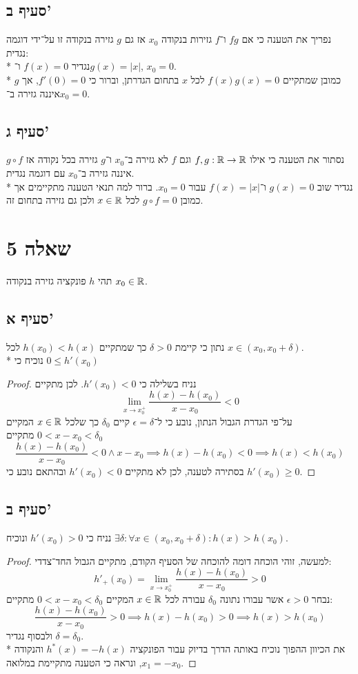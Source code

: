\subsection{סעיף ב'}
נפריך את הטענה כי אם $fg$ ו־$f$ גזירות בנקודה $x_0$ אז גם $g$ גזירה בנקודה זו על־ידי דוגמה נגדית: \\*
נגדיר $f(x) = 0$ ו־$g(x) = |x|$, $x_0 = 0$. \\*
כמובן שמתקיים $f(x) g(x) = 0$ לכל $x$ בתחום הגדרתן, וברור כי $f'(0) = 0$, אך $g$ איננה גזירה ב־$x_0 = 0$.

\subsection{סעיף ג'}
נסתור את הטענה כי אילו $f, g : \mathbb{R} \rightarrow \mathbb{R}$ וגם $f$ לא גזירה ב־$x_0$ ו־$g$ גזירה בכל נקודה אז $g \circ f$ איננה גזירה ב־$x_0$ עם דוגמה נגדית. \\*
נגדיר שוב $g(x) = 0$ ו־$f(x) = |x|$ עבור $x_0 = 0$. ברור למה תנאי הטענה מתקיימים אך כמובן $g \circ f = 0$ לכל $x \in \mathbb{R}$ ולכן גם גזירה בתחום זה.

\section{שאלה 5}
תהי $h$ פונקציה גזירה בנקודה $x_0 \in \mathbb{R}$.
\subsection{סעיף א'}
נתון כי קיימת $\delta > 0$ כך שמתקיים $h(x_0) < h(x)$ לכל $x \in (x_0, x_0 + \delta)$. \\*
נוכיח כי $0 \le h'(x_0)$
\begin{proof}
	נניח בשלילה כי $h'(x_0) < 0$. לכן מתקיים
	\[
		\lim_{x \to x_0^+} \frac{h(x) - h(x_0)}{x - x_0} < 0
	\]
	על־פי הגדרת הגבול הנתון, נובע כי ל־$\epsilon = \delta$ קיים $\delta_0$ כך שלכל $x \in \mathbb{R}$ המקיים $0 < x - x_0 < \delta_0$ מתקיים
	\[
		\frac{h(x) - h(x_0)}{x - x_0} < 0 \land x - x_0 \implies h(x) - h(x_0) < 0 \implies h(x) < h(x_0)
	\]
	בסתירה לטענה, לכן לא מתקיים $h'(x_0) < 0$ ובהתאם נובע כי $h'(x_0) \ge 0$.
\end{proof}

\subsection{סעיף ב'}
נניח כי $h'(x_0) > 0$ ונוכיח $\exists \delta : \forall x \in (x_0, x_0 + \delta) : h(x) > h(x_0)$.
\begin{proof}
	למעשה, זוהי הוכחה דומה להוכחה של הסעיף הקודם, מתקיים הגבול החד־צדדי:
	\[
		h'_+(x_0) = \lim_{x \to x_0^+} \frac{h(x) - h(x_0)}{x - x_0} > 0
	\]
	נבחר $\epsilon > 0$ אשר עבורו נתונה $\delta_0$ עבורה לכל $x \in \mathbb{R}$ המקיים $0 < x - x_0 < \delta_0$ מתקיים:
	\[
		\frac{h(x) - h(x_0)}{x - x_0} > 0 \implies h(x) - h(x_0) > 0 \implies h(x) > h(x_0)
	\]
	ולבסוף נגדיר $\delta = \delta_0$. \\*
	את הכיוון ההפוך נוכיח באותה הדרך בדיוק עבור הפונקציה $h^*(x) = -h(x)$ והנקודה $x_1 = -x_0$, ונראה כי הטענה מתקיימת במלואה.
\end{proof}


